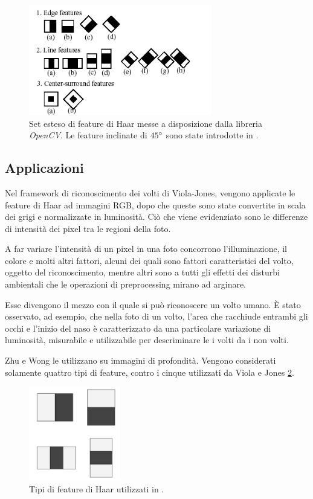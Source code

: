         \begin{figure}
            \centering
            \includegraphics[width=8cm]{img/open_cv_haar_features.png}
            \caption{Set esteso di feature di Haar messe a disposizione dalla libreria \emph{OpenCV}. 
            Le feature inclinate di $45 \degree$ sono state introdotte in \cite{Lienhart02}.}
            \label{fig:opencv_haar_features}
        \end{figure}

        \subsection{Applicazioni} %
        \label{sub:haar_features_applications}
            Nel framework di riconoscimento dei volti di Viola-Jones, vengono applicate le feature di Haar ad immagini RGB, dopo che queste sono state convertite in scala dei grigi e normalizzate in luminosità.
            Ciò che viene evidenziato sono le differenze di intensità dei pixel tra le regioni della foto.

            A far variare l'intensità di un pixel in una foto concorrono l'illuminazione, il colore e molti altri fattori, alcuni dei quali sono fattori caratteristici del volto, oggetto del riconoscimento, mentre altri sono a tutti gli effetti dei disturbi ambientali che le operazioni di preprocessing mirano ad arginare.

            Esse divengono il mezzo con il quale si può riconoscere un volto umano.
            È stato osservato, ad esempio, che nella foto di un volto, l'area che racchiude entrambi gli occhi e l'inizio del naso è caratterizzato da una particolare variazione di luminosità, misurabile e utilizzabile per descriminare le i volti da i non volti.

            Zhu e Wong le utilizzano su immagini di profondità.
            Vengono considerati solamente quattro tipi di feature, contro i cinque utilizzati da Viola e Jones \ref{fig:features_type}.
            \begin{figure}
                \centering
                \includegraphics[width=4cm]{img/feature_types.jpg}
                \caption{Tipi di feature di Haar utilizzati in \cite{Zhu13}.}
                \label{fig:features_type}
            \end{figure}

